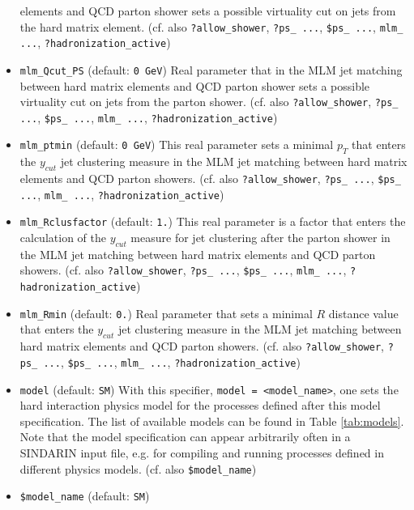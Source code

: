 \documentclass[12pt]{book}
\newcommand{\ttt}[1]{\texttt{#1}}
\begin{document}
\begin{itemize}
elements and QCD parton shower sets a possible virtuality cut on jets
from the hard matrix element. (cf. also
\ttt{?allow\_shower}, \ttt{?ps\_ ...}, \ttt{\$ps\_ ...}, \ttt{mlm\_
...}, \ttt{?hadronization\_active}) 
\item
\ttt{mlm\_Qcut\_PS} \qquad (default: \ttt{0 GeV}) \newline
Real parameter that in the MLM jet matching between hard matrix
elements and QCD parton shower sets a possible virtuality cut on jets
from the parton shower. (cf. also
\ttt{?allow\_shower}, \ttt{?ps\_ ...}, \ttt{\$ps\_ ...}, \ttt{mlm\_
...}, \ttt{?hadronization\_active}) 
\item
\ttt{mlm\_ptmin} \qquad (default: \ttt{0 GeV}) \newline
This real parameter sets a minimal $p_T$ that enters the $y_{cut}$ jet
clustering measure in the MLM jet matching between hard matrix
elements and QCD parton showers.  (cf. also
\ttt{?allow\_shower}, \ttt{?ps\_ ...}, \ttt{\$ps\_ ...}, \ttt{mlm\_
...}, \ttt{?hadronization\_active}) 
\item
\ttt{mlm\_Rclusfactor} \qquad (default: \ttt{1.}) \newline
This real parameter is a factor that enters the calculation of the
$y_{cut}$ measure for jet clustering after the parton shower in the
MLM jet matching between hard matrix elements and QCD parton showers. 
(cf. also \ttt{?allow\_shower}, \ttt{?ps\_ ...}, \ttt{\$ps\_ ...},
\ttt{mlm\_ ...}, \ttt{?hadronization\_active})  
\item
\ttt{mlm\_Rmin} \qquad (default: \ttt{0.}) \newline
Real parameter that sets a minimal $R$ distance value that enters the
$y_{cut}$ jet clustering measure in the MLM jet matching between hard
matrix elements and QCD parton showers.  (cf. also
\ttt{?allow\_shower}, \ttt{?ps\_ ...}, \ttt{\$ps\_ ...}, \ttt{mlm\_
...}, \ttt{?hadronization\_active}) 
\item
\ttt{model} \qquad (default: \ttt{SM}) \newline
With this specifier, \ttt{model = <model\_name>}, one sets the hard
interaction physics model for the processes defined after this model
specification. The list of available models can be found in Table
\ref{tab:models}. Note that the model specification can appear
arbitrarily often in a SINDARIN input file, e.g. for compiling and
running processes defined in different physics models. (cf. also
\ttt{\$model\_name})
\item
\ttt{\$model\_name} \qquad (default: \ttt{SM}) \newline

\end{itemize}
\end{document}
